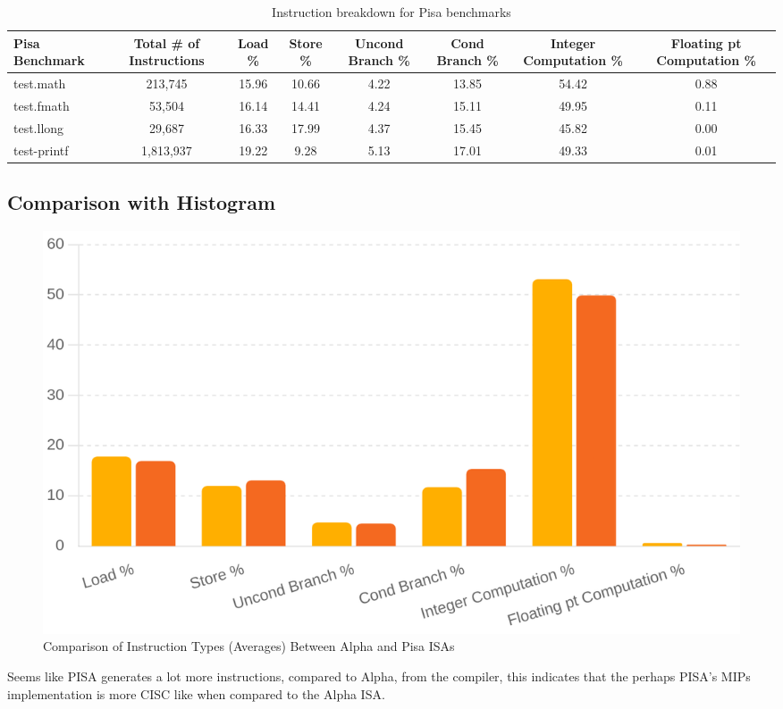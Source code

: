 \documentclass{article}
\begin{document}
\begin{table}[ht]
	\centering
	\begin{adjustbox}{max width=\textwidth}
		\begin{tabular}{|l|c|c|c|c|c|c|c|}
			\hline
			\textbf{Pisa Benchmark}      & \textbf{Total \# of Instructions} & \textbf{Load \%} & \textbf{Store \%} & \textbf{Uncond Branch \%} & \textbf{Cond Branch \%} & \textbf{Integer Computation \%} & \textbf{Floating pt Computation \%} \\ \hline
			test.math          &213,745&15.96&10.66&4.22&13.85&54.42&0.88 \\ \hline
			test.fmath                &53,504&16.14&14.41&4.24&15.11&49.95&0.11 \\ \hline
			test.llong          &29,687&16.33& 17.99&4.37&15.45&45.82&0.00      \\ \hline
			test-printf               &1,813,937&19.22&9.28&5.13&17.01&49.33&0.01 \\ \hline
		\end{tabular}
	\end{adjustbox}
	\caption{Instruction breakdown for Pisa benchmarks}
\end{table}
\subsection{Comparison with Histogram}
\begin{figure}[H]
	\centering
	\includegraphics[width=\linewidth]{Comparison of Instruction Types Between Alpha and Pisa ISAs.png}
	\caption{Comparison of Instruction Types (Averages) Between Alpha and Pisa ISAs}
	\label{fig:memory_bandwidth}
\end{figure}
Seems like PISA generates a lot more instructions, compared to Alpha, from the compiler, this indicates that the perhaps PISA's MIPs implementation is more CISC like when compared to the Alpha ISA. 
\end{document}
